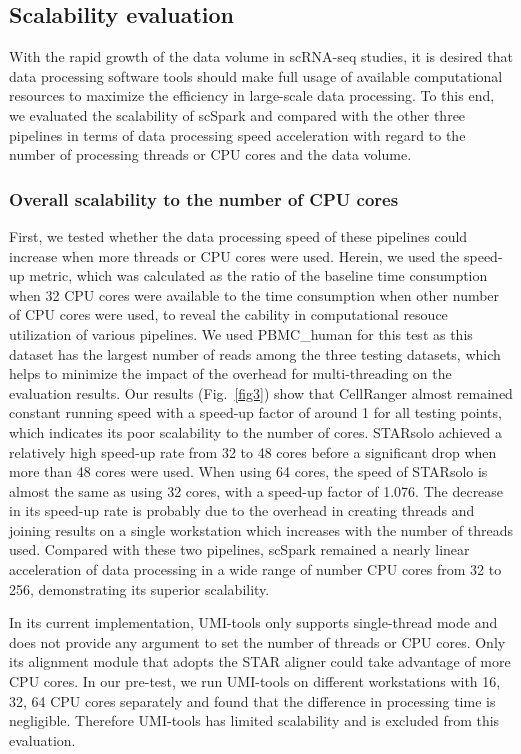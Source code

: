 \documentclass[conference]{IEEEtran}
\begin{document}
\subsection{Scalability evaluation}
With the rapid growth of the data volume in scRNA-seq studies, it is desired that data processing software tools should make full usage of available computational resources to maximize the efficiency in large-scale data processing. To this end, we evaluated the scalability of scSpark and compared with the other three pipelines in terms of data processing speed acceleration with regard to the number of processing threads or CPU cores and the data volume.

\subsubsection{Overall scalability to the number of CPU cores}
First, we tested whether the data processing speed of these pipelines could increase when more threads or CPU cores were used. Herein, we used the speed-up metric, which was calculated as the ratio of the baseline time consumption when 32 CPU cores were available to the time consumption when other number of CPU cores were used, to reveal the cability in computational resouce utilization of various pipelines. 
We used PBMC\_human for this test as this dataset has the largest number of reads among the three testing datasets, which helps to minimize the impact of the overhead for multi-threading on the evaluation results. 
Our results (Fig.~\ref{fig3}) show that CellRanger almost remained constant running speed with a speed-up factor of around 1 for all testing points, which indicates its poor scalability to the number of cores. 
STARsolo achieved a relatively high speed-up rate from 32 to 48 cores before a significant drop when more than 48 cores were used. When using 64 cores, the speed of STARsolo is almost the same as using 32 cores, with a speed-up factor of 1.076. 
The decrease in its speed-up rate is probably due to the overhead in creating threads and joining results on a single workstation which increases with the number of threads used. 
Compared with these two pipelines, scSpark remained a nearly linear acceleration of data processing in a wide range of number CPU cores from 32 to 256, demonstrating its superior scalability. 

In its current implementation, UMI-tools only supports single-thread mode and does not provide any argument to set the number of threads or CPU cores. Only its alignment module that adopts the STAR aligner could take advantage of more CPU cores. 
In our pre-test, we run UMI-tools on different workstations with 16, 32, 64 CPU cores separately and found that the difference in processing time is negligible. 
Therefore UMI-tools has limited scalability and is excluded from this evaluation. 
\end{document}
